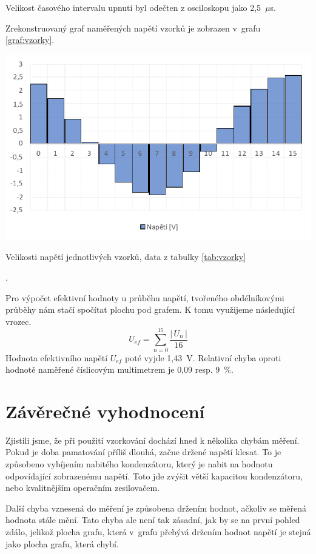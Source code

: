 \documentclass[a4paper,12pt]{article}   %
\newcommand{\tmu}{$\mu$}
\begin{document}
Velikost časového intervalu upnutí byl odečten z osciloskopu jako 2,5~\tmu s.

Zrekonstruovaný graf naměřených napětí vzorků je zobrazen v~grafu \ref{graf:vzorky}.

\begin{graf}
  \centering
  \includegraphics[width=.8\textwidth]{graf_vzorky.pdf}
  \caption{Velikosti napětí jednotlivých vzorků, data z tabulky \ref{tab:vzorky}}
  \label{graf:vzorky}
\end{graf}.

Pro výpočet efektivní hodnoty u průběhu napětí, tvořeného obdélníkovými průběhy nám stačí spočítat plochu pod grafem. K tomu využijeme následující vrozec.
\begin{equation}
  U_{ef} = \sum_{n=0}^{15} \frac{|\,U_n\,|}{16}
\end{equation}
Hodnota efektivního napětí $U_{ef}$ poté vyjde 1,43~V. Relativní chyba oproti hodnotě naměřené číslicovým multimetrem je 0,09 resp. 9~\%.


\section{Závěrečné vyhodnocení}
\label{chap:zaver}
Zjistili jsme, že při použití vzorkování dochází hned k několika chybám měření. Pokud je doba pamatování příliš dlouhá, začne držené napětí klesat. To je způsobeno vybíjením nabitého kondenzátoru, který je nabit na hodnotu odpovídající zobrazenému napětí. Toto jde zvýšit větší kapacitou kondenzátoru, nebo kvalitnějším operačním zesilovačem.

Další chyba vznesená do měření je způsobena držením hodnot, ačkoliv se měřená hodnota stále mění. Tato chyba ale není tak zásadní, jak by se na první pohled zdálo, jelikož plocha grafu, která v~grafu přebývá držením hodnot napětí je stejná jako plocha grafu, která chybí.
\end{document}
